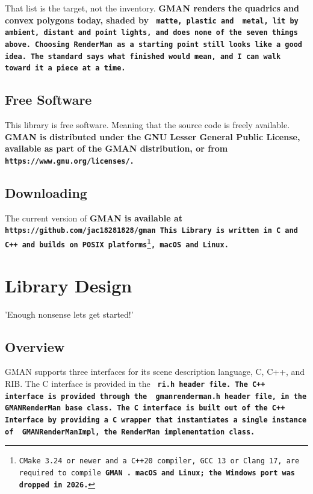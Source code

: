 \documentclass{book}	%
\def\gman{\bf GMAN \rm}
\def\text#1{\bf\tt #1 \rm}
\begin{document}
That list is the target, not the inventory.  \gman renders the quadrics
and convex polygons today, shaded by \text{ matte, plastic } and \text{
metal, } lit by ambient, distant and point lights, and does none of the
seven things above.  Choosing RenderMan as a starting point still looks
like a good idea.  The standard says what finished would mean, and I can
walk toward it a piece at a time.   

\section {Free Software}

This library is free software.  Meaning that the source code is freely
available.  \gman is distributed under the GNU Lesser General Public
License, available as part of the \gman distribution, or from \text{
https://www.gnu.org/licenses/. }

\section{Downloading}

The current version of \gman is available at \text
{ https://github.com/jac18281828/gman }
This Library is written in C and C++ and builds on POSIX
platforms\footnote{CMake 3.24 or newer and a C++20 compiler, GCC 13 or
Clang 17, are required to compile \gman.  macOS and Linux; the Windows
port was dropped in 2026.}, macOS and Linux.

\chapter{Library Design}
\begin{em}
'Enough nonsense lets get started!'
\end{em}
\section{Overview}

GMAN supports three interfaces for its scene description language, C,
C++, and RIB.  The C interface is provided in the \text { ri.h }
header file.  The C++ interface is provided through the \text{
gmanrenderman.h } header file, in the \text{ GMANRenderMan } base
class.  The C interface is built out of the C++ Interface by providing a
C wrapper that instantiates a single instance of \text{
GMANRenderManImpl, } the RenderMan implementation class.
\end{document}
